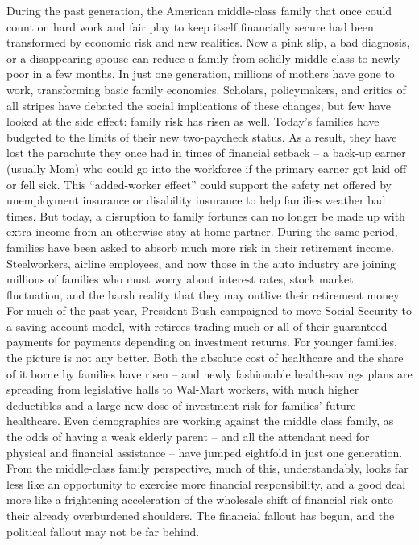 During the past generation, the American middle-class family that once could count on hard work and fair play to keep itself financially secure had been transformed by economic risk and new realities. Now a pink slip, a bad diagnosis, or a disappearing spouse can reduce a family from solidly middle class to newly poor in a few months.
In just one generation, millions of mothers have gone to work, transforming basic family economics. Scholars, policymakers, and critics of all stripes have debated the social implications of these changes, but few have looked at the side effect: family risk has risen as well. Today’s families have budgeted to the limits of their new two-paycheck status. As a result, they have lost the parachute they once had in times of financial setback – a back-up earner (usually Mom) who could go into the workforce if the primary earner got laid off or fell sick. This “added-worker effect” could support the safety net offered by unemployment insurance or disability insurance to help families weather bad times. But today, a disruption to family fortunes can no longer be made up with extra income from an otherwise-stay-at-home partner.
During the same period, families have been asked to absorb much more risk in their retirement income. Steelworkers, airline employees, and now those in the auto industry are joining millions of families who must worry about interest rates, stock market fluctuation, and the harsh reality that they may outlive their retirement money. For much of the past year, President Bush campaigned to move Social Security to a saving-account model, with retirees trading much or all of their guaranteed payments for payments depending on investment returns. For younger families, the picture is not any better. Both the absolute cost of healthcare and the share of it borne by families have risen – and newly fashionable health-savings plans are spreading from legislative halls to Wal-Mart workers, with much higher deductibles and a large new dose of investment risk for families’ future healthcare. Even demographics are working against the middle class family, as the odds of having a weak elderly parent – and all the attendant need for physical and financial assistance – have jumped eightfold in just one generation.
From the middle-class family perspective, much of this, understandably, looks far less like an opportunity to exercise more financial responsibility, and a good deal more like a frightening acceleration of the wholesale shift of financial risk onto their already overburdened shoulders. The financial fallout has begun, and the political fallout may not be far behind.
